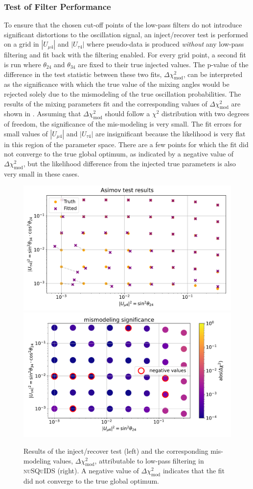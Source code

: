 \subsubsection{Test of Filter Performance}

To ensure that the chosen cut-off points of the low-pass filters do not introduce significant distortions to the oscillation signal, an inject/recover test is performed on a grid in $|U_{\mu 4}|$ and $|U_{\tau 4}|$ where pseudo-data is produced \emph{without} any low-pass filtering and fit back with the filtering enabled. For every grid point, a second fit is run where $\theta_{24}$ and $\theta_{34}$ are fixed to their true injected values. The p-value of the difference in the test statistic between these two fits, $\Delta \chi^2_{\mathrm{mod}}$, can be interpreted as the significance with which the true value of the mixing angles would be rejected solely due to the mismodeling of the true oscillation probabilities. The results of the mixing parameters fit and the corresponding values of $\Delta \chi^2_{\mathrm{mod}}$ are shown in . Assuming that $\Delta \chi^2_{\mathrm{mod}}$ should follow a $\chi^2$ distribution with two degrees of freedom, the significance of the mis-modeling is very small.
The fit errors for small values of $|U_{\mu 4}|$ and $|U_{\tau 4}|$ are insignificant because the likelihood is very flat in this region of the parameter space.
There are a few points for which the fit did not converge to the true global optimum, as indicated by a negative value of $\Delta \chi^2_\mathrm{mod}$, but the likelihood difference from the injected true parameters is also very small in these cases.

\begin{figure}
    \centering
    \includegraphics[width=0.49\linewidth]{figures/measurement/sterile_analysis/asimov_test/asimov_vs_v12_fit_err.pdf}
    \includegraphics[width=0.49\linewidth]{figures/measurement/sterile_analysis/asimov_test/asimov_vs_v12_mismod.pdf}
    \caption{Results of the inject/recover test (left) and the corresponding mis-modeling values, $\Delta \chi^2_{\mathrm{mod}}$, attributable to low-pass filtering in \textsc{nuSQuIDS} (right). A negative value of $\Delta \chi^2_\mathrm{mod}$ indicates that the fit did not converge to the true global optimum.}
    \label{fig:asimov-test-sterile-ana}
\end{figure}

